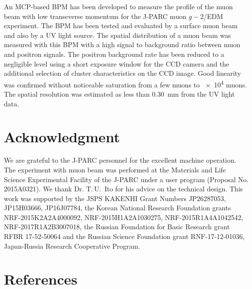 \documentclass[preprint,3p,twocolumn]{elsarticle}
\begin{document}
An MCP-based BPM has been developed to measure the profile of the
muon beam with low transeverse momentum for the J-PARC muon $g-2$/EDM experiment.
The BPM has been tested and evaluated by a surface muon beam and
also by a UV light source.  The spatial distribution of a muon
beam was measured with this
BPM with a high signal to background ratio between
muon and positron signals.  The positron background rate has been
reduced to a negligible level using a short exposure window for
the CCD camera and the additional selection of cluster
characteristics on the CCD image.  Good
linearity was confirmed without noticeable saturation from a few
muons to \num{e4} muons.  The spatial resolution was estimated as
less than \SI{.30}{\mm} from the UV light data.

\section*{Acknowledgment}

We are grateful to the J-PARC personnel for the excellent machine operation.
The experiment with muon beam was performed
at the Materials and Life Science Experimental Facility of the J-PARC 
under a user program (Proposal No. 2015A0321).
We thank Dr. T.\,U.~Ito for his advice on the technical design.
This work was supported by 
the JSPS KAKENHI Grant Numbers JP26287053, JP15H03666, JP16J07784,
the Korean National Research Foundation grants NRF-2015K2A2A4000092, NRF-2015H1A2A1030275, NRF-2015R1A4A1042542, NRF-2017R1A2B3007018,
the Russian Foundation for Basic Research grant RFBR 17-52-50064 and
the Russian Science Foundation grant RNF-17-12-01036,
Japan-Russia Research Cooperative Program.

\section*{References}


\end{document}
